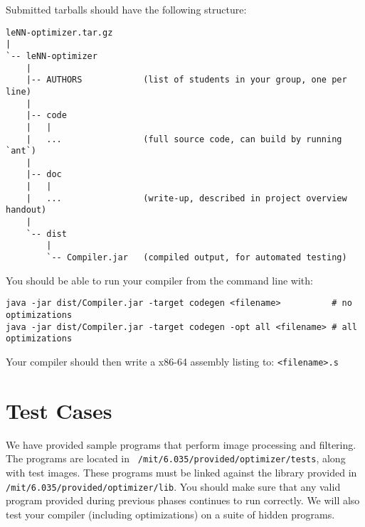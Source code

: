 Submitted tarballs should have the following structure:
{\scriptsize
\begin{verbatim}
leNN-optimizer.tar.gz
|
`-- leNN-optimizer
    |
    |-- AUTHORS            (list of students in your group, one per line)
    |
    |-- code
    |   |
    |   ...                (full source code, can build by running `ant`)
    |
    |-- doc 
    |   |
    |   ...                (write-up, described in project overview handout)
    |   
    `-- dist 
        |
        `-- Compiler.jar   (compiled output, for automated testing)
\end{verbatim}
}

You should be able to run your compiler from the command line with:
\begin{verbatim}
java -jar dist/Compiler.jar -target codegen <filename>          # no optimizations
java -jar dist/Compiler.jar -target codegen -opt all <filename> # all optimizations
\end{verbatim}
Your compiler should then write a x86-64 assembly listing to: {\tt <filename>.s}

\section*{Test Cases}

We have provided sample programs that perform image processing
and filtering.  The programs are located in {\tt
/mit/6.035/provided/optimizer/tests}, along with test images. These
programs must be linked against the library provided in {\tt
/mit/6.035/provided/optimizer/lib}. You should make sure that any
valid program provided during previous phases continues to run
correctly.  We will also test your compiler (including
optimizations) on a suite of hidden programs.


